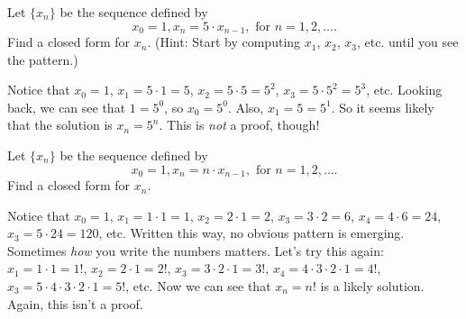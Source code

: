 \begin{exer}\label{exer:5pow}
Let $\{x_n\}$ be the sequence defined by 
$$x_0=1, x_n=5\cdot x_{n-1}, \mbox{ for }  n=1,2,\ldots.$$
Find a closed form for $x_n$.  (Hint: Start by computing $x_1$, $x_2$, $x_3$, etc. until you see the pattern.)

\vspace*{1.9in}
\begin{answer}
Notice that $x_0=1$, $x_1=5\cdot 1 = 5$, $x_2=5\cdot 5=5^2$, $x_3=5\cdot 5^2 = 5^3$, etc.
Looking back, we can see that $1=5^0$, so $x_0=5^0$.  Also, $x_1=5=5^1$.  So it seems likely that the
solution is $x_n=5^n$.  This is {\em not} a proof, though!
\end{answer}
\end{exer}

\begin{exer}\label{exer:factrec}
Let $\{x_n\}$ be the sequence defined by 
$$x_0=1, x_n=n\cdot x_{n-1}, \mbox{ for }  n=1,2,\ldots.$$
Find a closed form for $x_n$.


\vspace*{1.9in}
\begin{answer}
Notice that $x_0=1$, 
$x_1=1\cdot 1 = 1$, 
$x_2=2\cdot 1=2$, 
$x_3=3\cdot 2 = 6$,
$x_4=4\cdot 6 = 24$,
$x_3=5\cdot 24 = 120$, etc.
Written this way, no obvious pattern is emerging.  Sometimes {\em how} you write the numbers matters.
Let's try this again:
$x_1=1\cdot 1 = 1!$, 
$x_2=2\cdot 1=2!$, 
$x_3=3\cdot 2\cdot 1=3!$,
$x_4=4\cdot 3\cdot 2\cdot 1=4!$,
$x_3=5\cdot 4\cdot 3\cdot 2\cdot 1=5!$, etc.
Now we can see that $x_n=n!$ is a likely solution.  Again, this isn't a proof.
\end{answer}
\end{exer}

